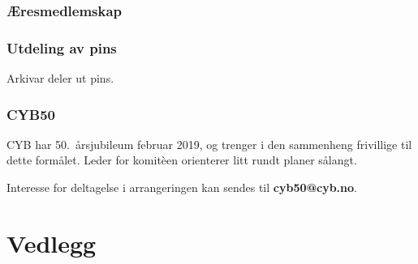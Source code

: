 \documentclass[10pt,norsk,a4paper]{article}
\begin{document}
\section{Æresmedlemskap}

\section{Utdeling av pins}

Arkivar deler ut pins.

\section{CYB50}

CYB har 50.~årsjubileum februar 2019, og trenger i den sammenheng frivillige til dette formålet. Leder for komitèen orienterer litt rundt planer sålangt.

Interesse for deltagelse i arrangeringen kan sendes til \textbf{cyb50@cyb.no}.

\part*{Vedlegg}\label{lastpage}

\newpage
{}



\end{document}
